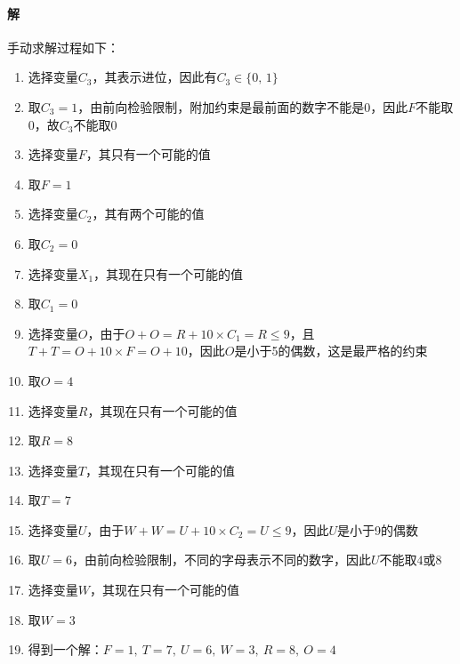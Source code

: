 \documentclass{article}
\begin{document}
\paragraph{解}
手动求解过程如下：
\begin{enumerate}[i]
    \item 选择变量$C_3$，其表示进位，因此有$C_3 \in \{0,\, 1\}$
    \item 取$C_3 = 1$，由前向检验限制，附加约束是最前面的数字不能是0，因此$F$不能取0，故$C_3$不能取0
    \item 选择变量$F$，其只有一个可能的值
    \item 取$F = 1$
    \item 选择变量$C_2$，其有两个可能的值
    \item 取$C_2 = 0$
    \item 选择变量$X_1$，其现在只有一个可能的值
    \item 取$C_1 = 0$
    \item 选择变量$O$，由于$O + O = R + 10 \times C_1 = R \leq 9$，且$T + T = O + 10 \times F = O + 10$，因此$O$是小于5的偶数，这是最严格的约束
    \item 取$O = 4$
    \item 选择变量$R$，其现在只有一个可能的值
    \item 取$R = 8$
    \item 选择变量$T$，其现在只有一个可能的值
    \item 取$T = 7$
    \item 选择变量$U$，由于$W + W = U + 10 \times C_2 = U \leq 9$，因此$U$是小于9的偶数
    \item 取$U = 6$，由前向检验限制，不同的字母表示不同的数字，因此$U$不能取$4$或$8$
    \item 选择变量$W$，其现在只有一个可能的值
    \item 取$W = 3$
    \item 得到一个解：$F = 1,\ T = 7,\ U = 6,\ W = 3,\ R = 8,\ O = 4$
\end{enumerate}
\end{document}
